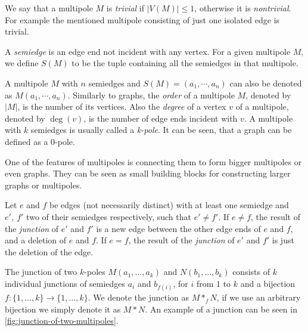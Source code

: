 \documentclass[12pt, twoside]{book}
\begin{document}
We say that a multipole $M$ is \textit{trivial} if $|V(M)|\leq 1$, otherwise it is \textit{nontrivial}. For example the mentioned multipole consisting of just one isolated edge is trivial.

A \textit{semiedge} is an edge end not incident with any vertex. For a given multipole $M$, we define $S(M)$ to be the tuple containing all the semiedges in that multipole.

A multipole $M$ with $n$ semiedges and $S(M) = (a_1, \cdots, a_n)$ can also be denoted as $M(a_1,\cdots,a_n)$. Similarly to graphs, the \textit{order} of a multipole $M$, denoted by $|M|$, is the number of its vertices. Also the \textit{degree} of a vertex $v$ of a multipole, denoted by $\deg(v)$, is the number of edge ends incident with $v$. A multipole with $k$ semiedges is usually called a \textit{k-pole}. It can be seen, that a graph can be defined as a 0-pole.

One of the features of multipoles is connecting them to form bigger multipoles or even graphs. They can be seen as small building blocks for constructing larger graphs or multipoles. 

Let $e$ and $f$ be edges (not necessarily distinct) with at least one semiedge and $e',~f'$ two of their semiedges respectively, such that $e'\neq f'$. If $e\neq f$, the result of the \textit{junction} of $e'$ and $f'$ is a new edge between the other edge ends of $e$ and $f$, and a deletion of $e$ and $f$. If $e=f$, the result of the \textit{junction} of $e'$ and $f'$ is just the deletion of the edge.

The junction of two $k$-poles $M(a_1,\dots,a_k)$ and $N(b_1,\dots,b_k)$ consists of $k$ individual junctions of semiedges $a_i$ and $b_{f(i)}$, for $i$ from $1$ to $k$ and a bijection $f:\{1,\dots,k\}\rightarrow\{1,\dots,k\}$. We denote the junction as $M*_fN$, if we use an arbitrary bijection we simply denote it as $M*N$. An example of a junction can be seen in \cref{fig:junction-of-two-multipoles}.
\end{document}

